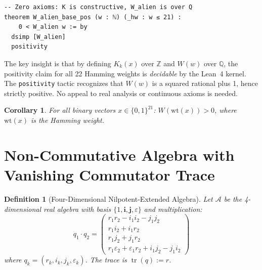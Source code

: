 \documentclass[11pt,a4paper]{article}
\newtheorem{corollary}[theorem]{Corollary}
\newtheorem{definition}[theorem]{Definition}
\begin{document}
\begin{lstlisting}[language=Lean, caption={Axiom-free witness positivity}]
-- Zero axioms: K is constructive, W_alien is over Q
theorem W_alien_base_pos (w : ℕ) (_hw : w ≤ 21) :
    0 < W_alien w := by
  dsimp [W_alien]
  positivity
\end{lstlisting}


The key insight is that by defining $K_k(x)$ over $\mathbb{Z}$ and
$W(w)$ over $\mathbb{Q}$, the positivity claim for all 22 Hamming
weights is \emph{decidable} by the Lean~4 kernel. The
\texttt{positivity} tactic recognizes that $W(w)$ is a squared
rational plus 1, hence strictly positive. No appeal to real analysis
or continuous axioms is needed.

\begin{corollary}
\label{cor:vertices}
For all binary vectors $x \in \{0,1\}^{21}$:
$W(\text{wt}(x)) > 0$, where $\text{wt}(x)$ is the Hamming weight.
\end{corollary}


\section{Non-Commutative Algebra with Vanishing Commutator Trace}
\label{sec:charging}


\begin{definition}[Four-Dimensional Nilpotent-Extended Algebra]
\label{def:charging}
Let $\mathcal{A}$ be the 4-dimensional real algebra with basis
$\{1, \mathbf{i}, \mathbf{j}, \varepsilon\}$ and multiplication:
\[
q_1 \cdot q_2 = \begin{pmatrix}
  r_1 r_2 - i_1 i_2 - j_1 j_2 \\
  r_1 i_2 + i_1 r_2 \\
  r_1 j_2 + j_1 r_2 \\
  r_1 \varepsilon_2 + \varepsilon_1 r_2 + i_1 j_2 - j_1 i_2
\end{pmatrix}
\]
where $q_k = (r_k, i_k, j_k, \varepsilon_k)$. The trace is
$\operatorname{tr}(q) := r$.
\end{definition}
\end{document}
